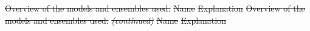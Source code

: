 \documentclass[10pt,letterpaper]{article}
\providecommand{\DIFdeltex}[1]{{\protect\color{red}\sout{#1}}}                      %
\providecommand{\DIFdel}[1]{\texorpdfstring{\DIFdeltex{#1}}{}} %
\begin{document}



{%
\DIFdel{Overview of the models and ensembles used.}}%
\DIFdel{Name }%
\DIFdel{Explanation}%
{%
\DIFdel{Overview of the models and ensembles used. }\textit{\DIFdel{(continued)}}%
}%
\DIFdel{Name }%
\DIFdel{Explanation}%
\end{document}
